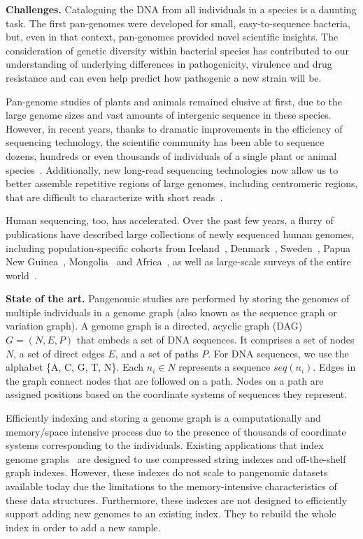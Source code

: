 \noindent
{\bf Challenges.}
Cataloguing the DNA from all individuals in a species is a daunting task. The first pan-genomes were developed for small, easy-to-sequence bacteria, but, even in that context, pan-genomes provided novel scientific insights. The consideration of genetic diversity within bacterial species has contributed to our understanding of underlying differences in pathogenicity, virulence and drug resistance and can even help predict how pathogenic a new strain will be.

Pan-genome studies of plants and animals remained elusive at first, due to the large genome sizes and vast amounts of intergenic sequence in these species. However, in recent years, thanks to dramatic improvements in the efficiency of sequencing technology, the scientific community has been able to sequence dozens, hundreds or even thousands of individuals of a single plant or animal species~\cite{XXX}. Additionally, new long-read sequencing technologies now allow us to better assemble repetitive regions of large genomes, including centromeric regions, that are difficult to characterize with short reads~\cite{XXX}.

Human sequencing, too, has accelerated. Over the past few years, a flurry of publications have described large collections of newly sequenced human genomes, including population-specific cohorts from Iceland~\cite{XXX}, Denmark~\cite{XXX}, Sweden~\cite{XXX}, Papua New Guinea~\cite{XXX}, Mongolia~\cite{XXX} and Africa~\cite{XXX}, as well as large-scale surveys of the entire world~\cite{XXX}.

\noindent
{\bf State of the art.}
Pangenomic studies are performed by storing the genomes of multiple individuals in a genome graph (also known as the sequence graph or variation graph). A genome graph is a directed, acyclic graph (DAG) $G = (N, E, P)$ that embeds a set of DNA sequences. It comprises a set of nodes $N$, a set of direct edges $E$, and a set of paths $P$. For DNA sequences, we use the alphabet \{A, C, G, T, N\}\@. Each $n_i \in N$ represents a sequence $seq(n_i)$. Edges in the graph connect nodes that are followed on a path. Nodes on a path are assigned positions based on the coordinate systems of sequences they represent.

Efficiently indexing and storing a genome graph is a computationally and memory/space intensive process due to the presence of thousands of coordinate systems corresponding to the individuals. Existing applications that index genome graphs~\cite{pandey2021variantstore,garrison2018variation} are designed to use compressed string indexes and off-the-shelf graph indexes. However, these indexes do not scale to pangenomic datasets available today due the limitations to the memory-intensive characteristics of these data structures. Furthermore, these indexes are not designed to efficiently support adding new genomes to an existing index. They to rebuild the whole index in order to add a new sample.

